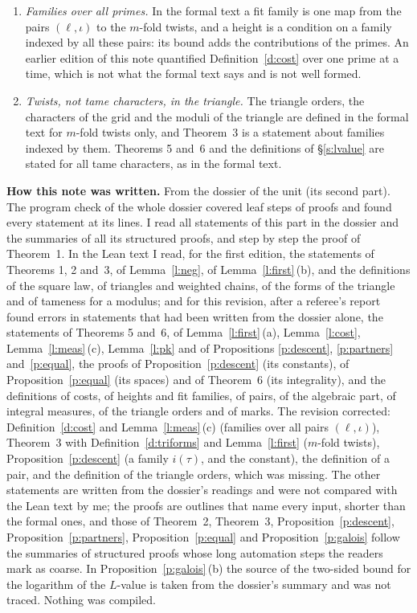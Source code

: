 \documentclass[11pt,a4paper]{article}
\newcommand{\subhead}[1]{\par\addvspace{9pt plus 2pt}\Needspace{4\baselineskip}\noindent\textbf{#1}\enspace\ignorespaces}
\theoremstyle{plainx}
\theoremstyle{uprightx}
\begin{document}
\begin{enumerate}[label=\textup{\arabic*.},leftmargin=1.6em,itemsep=5pt]
not in this note.
\item \emph{Families over all primes.} In the formal text a fit family is one map from the pairs $(\ell,\iota)$ to
the $m$-fold twists, and a height is a condition on a family indexed by all these pairs: its bound adds the
contributions of the primes. An earlier edition of this note quantified Definition~\ref{d:cost} over one prime at
a time, which is not what the formal text says and is not well formed.
\item \emph{Twists, not tame characters, in the triangle.} The triangle orders, the characters of the grid and the
moduli of the triangle are defined in the formal text for $m$-fold twists only, and Theorem~3 is a statement
about families indexed by them. Theorems 5 and~6 and the definitions of §\ref{s:lvalue} are stated for all tame
characters, as in the formal text.
\end{enumerate}

\subhead{How this note was written.} From the dossier of the unit (its second part). The program check of the
whole dossier covered \UnitSteps{} leaf steps of \UnitProofs{} proofs and found every statement at its lines. I
read all statements of this part in the dossier and the summaries of all its structured proofs, and step by step
the proof of Theorem~1. In the Lean text I read, for the first edition, the statements of Theorems 1, 2 and~3, of
Lemma~\ref{l:neg}, of Lemma~\ref{l:first}\,(b), and the definitions of the square law, of triangles and weighted
chains, of the forms of the triangle and of tameness for a modulus; and for this revision, after a referee's
report found errors in statements that had been written from the dossier alone, the statements of Theorems 5
and~6, of Lemma~\ref{l:first}\,(a), Lemma~\ref{l:cost}, Lemma~\ref{l:meas}\,(c), Lemma~\ref{l:pk} and of
Propositions \ref{p:descent}, \ref{p:partners} and~\ref{p:equal}, the proofs of Proposition~\ref{p:descent} (its
constants), of Proposition~\ref{p:equal} (its spaces) and of Theorem~6 (its integrality), and the definitions of
costs, of heights and fit families, of pairs, of the algebraic part, of integral measures, of the triangle orders
and of marks. The revision corrected: Definition~\ref{d:cost} and Lemma~\ref{l:meas}\,(c) (families over all
pairs $(\ell,\iota)$), Theorem~3 with Definition~\ref{d:triforms} and Lemma~\ref{l:first} ($m$-fold twists),
Proposition~\ref{p:descent} (a family $i(\tau)$, and the constant), the definition of a pair, and the definition
of the triangle orders, which was missing. The other statements are written from the dossier's readings and were
not compared with the Lean text by me; the proofs are outlines that name every input, shorter than the formal
ones, and those of Theorem~2, Theorem~3, Proposition~\ref{p:descent}, Proposition~\ref{p:partners},
Proposition~\ref{p:equal} and Proposition~\ref{p:galois} follow the summaries of structured proofs whose long
automation steps the readers mark as coarse. In Proposition~\ref{p:galois}\,(b) the source of the two-sided bound
for the logarithm of the $L$-value is taken from the dossier's summary and was not traced. Nothing was compiled.
\end{document}
